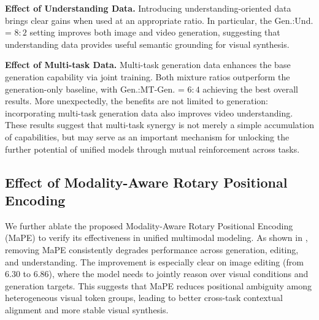 \textbf{Effect of Understanding Data.}
Introducing understanding-oriented data brings clear gains when used at an appropriate ratio. In particular, the Gen.:Und. = $8:2$ setting improves both image and video generation, suggesting that understanding data provides useful semantic grounding for visual synthesis. 

\textbf{Effect of Multi-task Data.}
Multi-task generation data enhances the base generation capability via joint training. Both mixture ratios outperform the generation-only baseline, with Gen.:MT-Gen. = $6:4$ achieving the best overall results. 
More unexpectedly, the benefits are not limited to generation: incorporating multi-task generation data also improves video understanding.
These results suggest that multi-task synergy is not merely a simple accumulation of capabilities, but may serve as an important mechanism for unlocking the further potential of unified models through mutual reinforcement across tasks.



\subsection{Effect of Modality-Aware Rotary Positional Encoding}

We further ablate the proposed Modality-Aware Rotary Positional Encoding (MaPE) to verify its effectiveness in unified multimodal modeling. As shown in , removing MaPE consistently degrades performance across generation, editing, and understanding. 
The improvement is especially clear on image editing (from $6.30$ to $6.86$), where the model needs to jointly reason over visual conditions and generation targets. This suggests that MaPE reduces positional ambiguity among heterogeneous visual token groups, leading to better cross-task contextual alignment and more stable visual synthesis.


